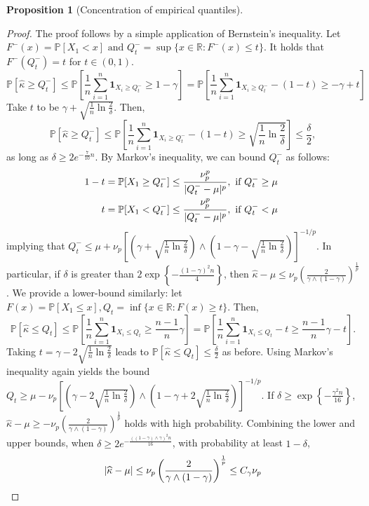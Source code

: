 \documentclass{article}
\theoremstyle{plain}
\newtheorem{proposition}[theorem]{Proposition}
\theoremstyle{definition}
\def\R{\mathbb{R}} %
\renewcommand{\Pr}{\mathbb{P}}
\begin{document}
\begin{appendix}
\begin{proposition}[Concentration of empirical quantiles]
\end{proposition}
\begin{proof}
  The proof follows by a simple application of Bernstein's inequality. Let \( F^-(x)=\Pr[X_1<x] \text{ and } Q^-_t = \sup \{x \in \R: F^-(x)\le t\}  \). It holds that \( F^-(Q^-_t)=t \) for \( t \in (0,1) \).  
 \[
   \Pr\left[\widehat{\kappa } \ge Q_t^- \right]\le \Pr\left[\frac{1}{n}\sum_{i=1}^n \mathbf{1}_{X_i\ge Q_t^-}\ge 1-\gamma  \right]=\Pr\left[\frac{1}{n}\sum_{i=1}^n \mathbf{1}_{X_i\ge Q_t^-} - (1-t)\ge  -\gamma +t \right]
 \]
 Take \( t \) to be \( \gamma + \sqrt{\frac{1}{n}\ln \frac{2}{\delta }}  \). Then, \[
\Pr\left[\widehat{\kappa } \ge Q_t^- \right] \le  \Pr\left[\frac{1}{n}\sum_{i=1}^n \mathbf{1}_{X_i\ge Q_t^-} - (1-t)\ge \sqrt{\frac{1}{n}\ln \frac{2}{\delta }}  \right]\le \frac{\delta}{2},
 \] 
 as long as \( \delta \ge 2e^{-\frac{7}{10}n} \). 
By Markov's inequality, we can bound \( Q_t^- \) as follows:
\begin{align*}
  1-t = \Pr[X_1 \ge  Q_t^-] &\le  \frac{\nu_p^p}{\lvert Q_t^--\mu \rvert^p}, \text{ if \( Q_t^- \ge \mu  \) }\\
  t = \Pr[X_1 <  Q_t^-] &\le  \frac{\nu_p^p}{\lvert Q_t^--\mu \rvert^p}, \text{ if \( Q_t^- < \mu  \) }
\end{align*} 
implying that \( Q_t^- \le \mu + \nu_p \left[\left(\gamma + \sqrt{\frac{1}{n}\ln \frac{2}{\delta }}\right)\wedge \left(1-\gamma - \sqrt{\frac{1}{n}\ln \frac{2}{\delta }}\right)  \right]^{-1/p}. \) In particular, if \( \delta  \) is greater than  \( 2\exp\left\{-\frac{(1-\gamma )^2n}{4}\right\} \), then \( \widehat{\kappa } -\mu \le \nu_p\left(\frac{2}{\gamma \wedge (1-\gamma ) }\right)^{\frac{1}{p}}  \). 
We provide a lower-bound similarly: let \( F(x)=\Pr[X_1 \le x], Q_t = \inf \{x \in  \R: F(x)\ge  t\}  \). Then,
 \[
   \Pr\left[\widehat{\kappa } \le Q_t \right]\le \Pr\left[\frac{1}{n}\sum_{i=1}^n \mathbf{1}_{X_i\le Q_t}\ge \frac{n-1}{n}\gamma \right]=\Pr\left[\frac{1}{n}\sum_{i=1}^n \mathbf{1}_{X_i\le Q_t} - t\ge \frac{n-1}{n}\gamma -t \right].
 \]
 Taking \( t=\gamma -2\sqrt{\frac{1}{n}\ln \frac{2}{\delta }}  \) leads to \( \Pr[\widehat{\kappa }\le Q_t ] \le \frac{\delta}{2} \) as before. Using Markov's inequality again yields the bound \( Q_t \ge \mu - \nu _p\left[\left(\gamma - 2\sqrt{\frac{1}{n}\ln \frac{2}{\delta }}\right)\wedge \left(1-\gamma + 2\sqrt{\frac{1}{n}\ln \frac{2}{\delta }}\right)  \right]^{-1/p} \). If \( \delta \ge \exp \left\{-\frac{\gamma^2n}{16}\right\}  \), \( \widehat{\kappa } -\mu \ge -\nu_p\left(\frac{2}{\gamma \wedge (1-\gamma )}\right)^{\frac{1}{p}}  \) holds with high probability. Combining the lower and upper bounds, when \( \delta \ge 2e^{-\frac{((1-\gamma )\wedge \gamma)^2n}{16}} \), with probability at least \( 1-\delta  \), \[
   \lvert \widehat{\kappa }-\mu   \rvert \le \nu_p \left(\frac{2}{\gamma\wedge (1-\gamma ) }\right)^{\frac{1}{p}}\le C_\gamma \nu _p \qedhere
 \] 


\end{proof}
\end{appendix}
\end{document}
